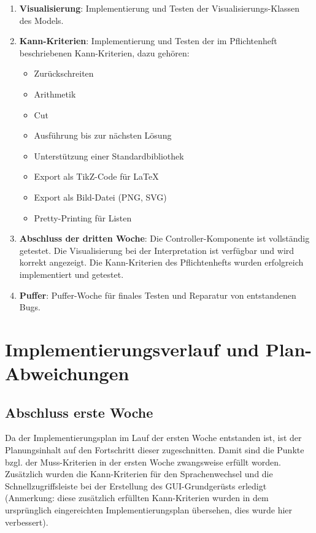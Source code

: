 \documentclass[parskip=full,11pt,twoside]{scrartcl}
\begin{document}
\begin{enumerate}
	\item \textbf{Visualisierung}: Implementierung und Testen der Visualisierungs-Klassen des Models.
	\newpage
	\item \textbf{Kann-Kriterien}: Implementierung und Testen der im Pflichtenheft beschriebenen Kann-Kriterien, dazu gehören:
	\begin{multicols}{2}
		\begin{itemize}
			\item Zurückschreiten
			\item Arithmetik
			\item Cut
			\item Ausführung bis zur nächsten Lösung
			\item Unterstützung einer Standardbibliothek
			\item Export als TikZ-Code für LaTeX
			\item Export als Bild-Datei (PNG, SVG)
			\item Pretty-Printing für Listen
		\end{itemize}
	\end{multicols}
	
	\item \textbf{Abschluss der dritten Woche}: Die Controller-Komponente ist vollständig getestet. Die Visualisierung bei der Interpretation ist verfügbar und wird korrekt angezeigt. Die Kann-Kriterien des Pflichtenhefts wurden erfolgreich implementiert und getestet.
	
	\item \textbf{Puffer}: Puffer-Woche für finales Testen und Reparatur von entstandenen Bugs.
\end{enumerate}

\section{Implementierungsverlauf und Plan-Abweichungen}

\subsection{Abschluss erste Woche}
Da der Implementierungsplan im Lauf der ersten Woche entstanden ist, ist der Planungsinhalt auf den Fortschritt dieser zugeschnitten. Damit sind die Punkte bzgl. der Muss-Kriterien in der ersten Woche zwangsweise erfüllt worden. Zusätzlich wurden die Kann-Kriterien für den Sprachenwechsel und die Schnellzugriffsleiste bei der Erstellung des GUI-Grundgerüsts erledigt (Anmerkung: diese zusätzlich erfüllten Kann-Kriterien wurden in dem ursprünglich eingereichten Implementierungsplan übersehen, dies wurde hier verbessert).
\end{document}
